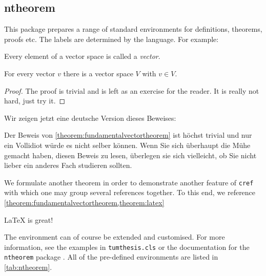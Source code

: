 \subsection{ntheorem}
\label{sec:intro:ntheorem}
This package prepares a range of standard environments for definitions, theorems, proofs etc. The labels are determined by the language. For example:
\begin{definition}
Every element of a vector space is called a \emph{vector}.
\end{definition}

\begin{theorem}
  \label{theorem:fundamentalvectortheorem}
  For every vector $v$ there is a vector space $V$ with $v\in V$.
\end{theorem}
\begin{proof}
  The proof is trivial and is left as an exercise for the reader. It is really not hard, just try it.
\end{proof}

Wir zeigen jetzt eine deutsche Version dieses Beweises:
\begin{beweis}
  Der Beweis von \cref{theorem:fundamentalvectortheorem} ist höchst trivial und nur ein Vollidiot würde es nicht selber können. Wenn Sie sich überhaupt die Mühe gemacht haben, diesen Beweis zu lesen, überlegen sie sich vielleicht, ob Sie nicht lieber ein anderes Fach studieren sollten.
\end{beweis}


We formulate another theorem in order to demonstrate another feature of \texttt{cref} with which one may group several references together. To this end, we reference \cref{theorem:fundamentalvectortheorem,theorem:latex}
\begin{theorem}
  \label{theorem:latex}
  \LaTeX{} is great!
\end{theorem}

The environment can of course be extended and customised. For more information, see the examples in \texttt{tumthesis.cls} or the documentation for the \texttt{ntheorem} package \cite{ntheorem}. All of the pre-defined environments are listed in \cref{tab:ntheorem}.




